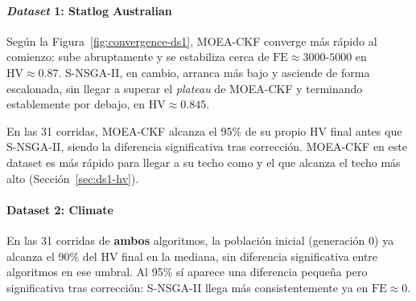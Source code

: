 \paragraph{\textit{Dataset} 1: Statlog Australian}\label{sec:ds1-convergencia}

Según la Figura~\ref{fig:convergence-ds1}, MOEA-CKF converge más rápido al comienzo: sube abruptamente y se estabiliza cerca de $\text{FE}\approx3000$-$5000$ en $\text{HV}\approx0.87$. S-NSGA-II, en cambio, arranca más bajo y asciende de forma escalonada, sin llegar a superar el \textit{plateau} de MOEA-CKF y terminando establemente por debajo, en $\text{HV}\approx0.845$.

En las 31 corridas, MOEA-CKF alcanza el 95\% de su propio HV final antes que S-NSGA-II, siendo la diferencia significativa tras corrección. MOEA-CKF en este dataset es más rápido para llegar a su techo como y el que alcanza el techo más alto (Sección~\ref{sec:ds1-hv}).


\paragraph{Dataset 2: Climate}\label{sec:ds2-convergencia}

En las 31 corridas de \textbf{ambos} algoritmos, la población inicial (generación 0) ya alcanza el 90\% del HV final en la mediana, sin diferencia significativa entre algoritmos en ese umbral. Al 95\% sí aparece una diferencia pequeña pero significativa tras corrección: S-NSGA-II llega más consistentemente ya en $\text{FE}\approx0$. 

